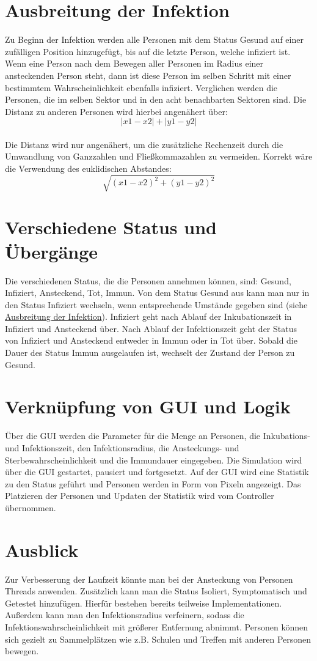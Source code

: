 \documentclass{article}
\begin{document}
	
	\section{Ausbreitung der Infektion}
	\label{sec:ausbreitung}
	Zu Beginn der Infektion werden alle Personen mit dem Status Gesund auf einer zufälligen Position hinzugefügt, bis auf die letzte Person, welche infiziert ist. Wenn eine Person nach dem Bewegen aller Personen im Radius einer ansteckenden Person steht, dann ist diese Person im selben Schritt mit einer bestimmtem Wahrscheinlichkeit ebenfalls infiziert. Verglichen werden die Personen, die im selben Sektor und in den acht benachbarten Sektoren sind. Die Distanz zu anderen Personen wird hierbei angenähert über: \\
		\[|x1 - x2| + |y1 - y2| \]
	\\
	Die Distanz wird nur angenähert, um die zusätzliche Rechenzeit durch die Umwandlung von Ganzzahlen und Fließkommazahlen zu vermeiden. Korrekt wäre die Verwendung des euklidischen Abstandes: \\
	\[ \sqrt{{(x1 - x2)}^2 + {(y1 - y2)}^2} \]
	
	\section{Verschiedene Status und Übergänge}
	Die verschiedenen Status, die die Personen annehmen können, sind: Gesund, Infiziert, Ansteckend, Tot, Immun. Von dem Status Gesund aus kann man nur in den Status Infiziert wechseln, wenn entsprechende Umstände gegeben sind (siehe \hyperref[sec:ausbreitung]{Ausbreitung der Infektion}). Infiziert geht nach Ablauf der Inkubationszeit in Infiziert und Ansteckend über. Nach Ablauf der Infektionszeit geht der Status von Infiziert und Ansteckend entweder in Immun oder in Tot über. Sobald die Dauer des Status Immun ausgelaufen ist, wechselt der Zustand der Person zu Gesund.
	
	
	\section{Verknüpfung von GUI und Logik}
	Über die GUI werden die Parameter für die Menge an Personen, die Inkubations- und Infektionszeit, den Infektionsradius, die Ansteckungs- und Sterbewahrscheinlichkeit und die Immundauer eingegeben. Die Simulation wird über die GUI gestartet, pausiert und fortgesetzt. Auf der GUI wird eine Statistik zu den Status geführt und Personen werden in Form von Pixeln angezeigt. Das Platzieren der Personen und Updaten der Statistik wird vom Controller übernommen. 
	
	\section{Ausblick}
	Zur Verbesserung der Laufzeit könnte man bei der Ansteckung von Personen Threads anwenden. Zusätzlich kann man die Status Isoliert, Symptomatisch und Getestet hinzufügen. Hierfür bestehen bereits teilweise Implementationen. Außerdem kann man den Infektionsradius verfeinern, sodass die Infektionswahrscheinlichkeit mit größerer Entfernung abnimmt. Personen können sich gezielt zu Sammelplätzen wie z.B. Schulen und Treffen mit anderen Personen bewegen.
	
\end{document}
